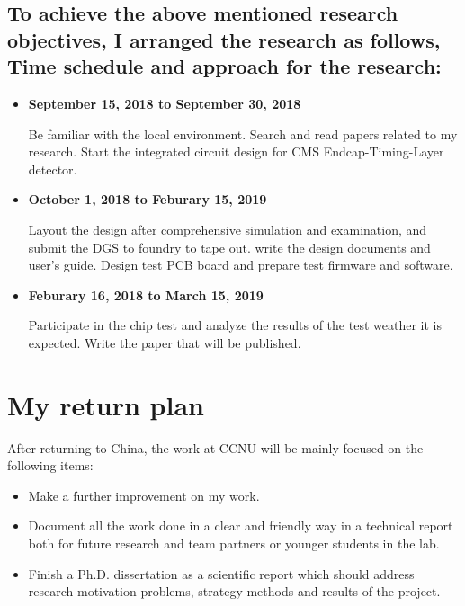\documentclass[11pt,a4paper]{article}
\begin{document}
\begin{spacing}{1.2}
\subsection*{To achieve the above mentioned research objectives, I arranged the research as follows, Time schedule and approach for the research:}
\begin{itemize}
    \item \textbf{September 15, 2018 to September 30, 2018}

Be familiar with the local environment. Search and read papers related to my research. Start the integrated circuit design for CMS Endcap-Timing-Layer detector.
    \item \textbf{October 1, 2018 to Feburary 15, 2019}
    
Layout the design after comprehensive simulation and examination, and submit the DGS to foundry to tape out. write the design documents and user's guide. Design test PCB board and prepare test firmware and software.
    \item \textbf{Feburary 16, 2018 to March 15, 2019}

Participate in the chip test and analyze the results of the test weather it is expected. Write the paper that will be published.
\end{itemize}

\section*{My return plan}     %

After returning to China, the work at CCNU will be mainly focused on the following items:
\begin{itemize}
    \item Make a further improvement on my work.
    \item Document all the work done in a clear and friendly way in a technical report both for future research and team partners or younger students in the lab.
    \item Finish a Ph.D. dissertation as a scientific report which should address research motivation problems, strategy methods and results of the project.
\end{itemize}

\vspace{1cm}


\vspace{0.5cm}
\end{spacing}
\end{document}
